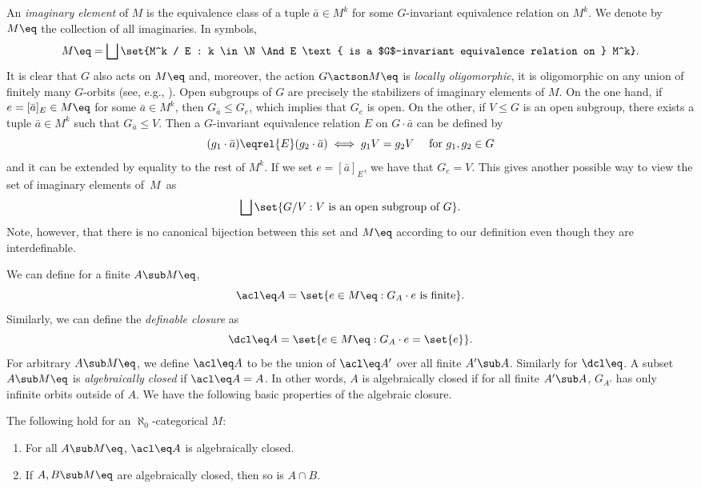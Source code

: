 An \emph{imaginary element} of $M$ is the equivalence class of a tuple $\bar a \in M^k$ for some $G$-invariant equivalence relation on $M^k$. We denote by $M\eq$ the collection of all imaginaries. In symbols,
\begin{equation*}
M\eq = \bigsqcup \set{M^k / E : k \in \N \And E \text{ is a $G$-invariant equivalence relation on } M^k}.
\end{equation*}
It is clear that $G$ also acts on $M\eq$ and, moreover, the action $G \actson M\eq$ is \emph{locally oligomorphic}, \ie it is oligomorphic on any union of finitely many $G$-orbits (see, e.g., \cite[Th.\,2.4]{Tsankov2012}). Open subgroups of $G$ are precisely the stabilizers of imaginary elements of $M$. On the one hand, if $e = [\bar a]_E \in M\eq$ for some $\bar a \in M^k$, then $G_{\bar a} \leq G_e$, which implies that $G_e$ is open. On the other, if $V \leq G$ is an open subgroup, there exists a tuple $\bar a \in M^k$ such that $G_{\bar a} \leq V$. Then a $G$-invariant equivalence relation $E$ on $G \cdot \bar a$ can be defined by
\begin{equation}
\label{eq:def-imaginary-eqrel}
(g_1 \cdot \bar a) \eqrel{E} (g_2 \cdot \bar a) \iff g_1V = g_2V \quad \text{ for } g_1, g_2 \in G
\end{equation}
and it can be extended by equality to the rest of $M^k$. If we set $e = [\bar a]_E$, we have that $G_e = V$. This gives another possible way to view the set of imaginary elements of~$M$~as
\begin{equation*}
\bigsqcup \set{G/V : V \text{ is an open subgroup of } G}.
\end{equation*}
Note, however, that there is no canonical bijection between this set and $M\eq$ according to our definition even though they are interdefinable.

We can define for a finite $A \sub M\eq$,
\begin{equation*}
\acl\eq A = \set{e \in M\eq : G_A \cdot e \text{ is finite}}.
\end{equation*}
Similarly, we can define the \emph{definable closure} as
\begin{equation*}
\dcl\eq A = \set{e \in M\eq : G_A \cdot e = \set{e}}.
\end{equation*}
For arbitrary $A \sub M\eq$, we define $\acl\eq A$ to be the union of $\acl\eq A'$ over all finite $A' \sub A$. Similarly for $\dcl\eq$. A subset $A \sub M\eq$ is \emph{algebraically closed} if $\acl\eq A = A$. In other words, $A$ is algebraically closed if for all finite $A' \sub A$, $G_{A'}$ has only infinite orbits outside of $A$.
We have the following basic properties of the algebraic closure.
\begin{lemma}
\label{l:acl}
The following hold for an $\aleph_0$-categorical $M$:
\begin{enumerate}
\item \label{i:acl:1} For all $A \sub M\eq$, $\acl\eq A$ is algebraically closed.
\item \label{i:acl:2} If $A, B \sub M\eq$ are algebraically closed, then so is $A \cap B$.
\end{enumerate}
\end{lemma}

